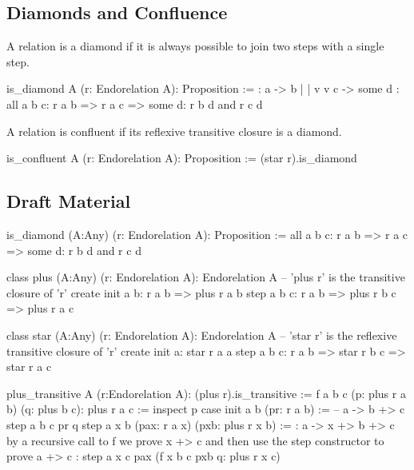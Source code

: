 \subsection{Diamonds and Confluence}


A relation is a diamond if it is always possible to join two steps with a
single step.

\begin{alba}
  is_diamond A (r: Endorelation A): Proposition :=
      {:   a  ->  b
           |      |
           v      v
           c  -> some d :}
    all a b c:
      r a b
      => r a c
      => some d: r b d and r c d
\end{alba}


A relation is confluent if its reflexive transitive closure is a diamond.

\begin{alba}
  is_confluent A (r: Endorelation A): Proposition :=
    (star r).is_diamond
\end{alba}







\subsection{Draft Material}


\begin{alba}
  is_diamond (A:Any) (r: Endorelation A): Proposition :=
    all a b c: r a b => r a c => some d: r b d and r c d

  class
    plus (A:Any) (r: Endorelation A): Endorelation A
      -- 'plus r' is the transitive closure of 'r'
  create
    init a b: r a b => plus r a b
    step a b c: r a b => plus r b c => plus r a c

  class
    star (A:Any) (r: Endorelation A): Endorelation A
      -- 'star r' is the reflexive transitive closure of 'r'
  create
    init a: star r a a
    step a b c: r a b => star r b c => star r a c
\end{alba}







\begin{alba}
  plus_transitive A (r:Endorelation A): (plus r).is_transitive :=
    f a b c (p: plus r a b) (q: plus b c): plus r a c :=
      inspect
        p
      case
        init a b (pr: r a b) :=
            -- a -> b +> c
          step a b c pr q
        step a x b (pax: r a x) (pxb: plus r x b) :=
            {: a -> x +> b +> c
               by a recursive call to f we prove x +> c
               and then use the step constructor to prove a +> c :}
          step a x c pax (f x b c pxb q: plus r x c)
\end{alba}












